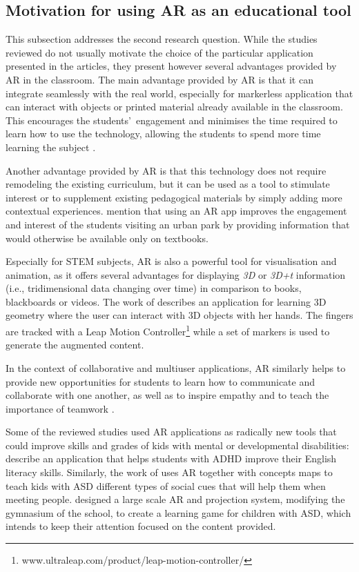 \subsection{Motivation for using AR as an educational tool}

This subsection addresses the second research question. While the studies reviewed do not usually motivate the choice of the particular application presented in the articles, they present however several advantages provided by AR in the classroom. The main advantage provided by AR is that it can integrate seamlessly with the real world, especially for markerless application that can interact with objects or printed material already available in the classroom. This encourages the students'\  engagement and minimises the time required to learn how to use the technology, allowing the students to spend more time learning the subject \citep{thamrongrat2019design}.

Another advantage provided by AR is that this technology does not require remodeling the existing curriculum, but it can be used as a tool to stimulate interest or to supplement existing pedagogical materials by simply adding more contextual experiences. \citet{pombo2018edupark} mention that using an AR app improves the engagement and interest of the students visiting an urban park by providing information that would otherwise be available only on textbooks.

Especially for STEM subjects, AR is also a powerful tool for visualisation and animation, as it offers several advantages for displaying \emph{3D} or \emph{3D+t} information (i.e., tridimensional data changing over time) in comparison to books, blackboards or videos. The work of \citet{cao2019hand} describes an application for learning 3D geometry where the user can interact with 3D objects with her hands. The fingers are tracked with a Leap Motion Controller\footnote{www.ultraleap.com/product/leap-motion-controller/} while a set of markers is used to generate the augmented content.

In the context of collaborative and multiuser applications, AR similarly helps to provide new opportunities for students to learn how to communicate and collaborate with one another, as well as to inspire empathy and to teach the importance of teamwork \citep{hill2013classroom}.

Some of the reviewed studies used AR applications as radically new tools that could improve skills and grades of kids with mental or developmental disabilities: \citet{luna2018words} describe an application that helps students with \gls{ADHD} improve their English literacy skills. Similarly, the work of \citet{chen2019effects} uses AR together with concepts maps to teach kids with \gls{ASD} different types of social cues that will help them when meeting people. \citet{takahashi2018empathic} designed a large scale AR and projection system, modifying the gymnasium of the school, to create a learning game for children with \gls{ASD}, which intends to keep their attention focused on the content provided.

